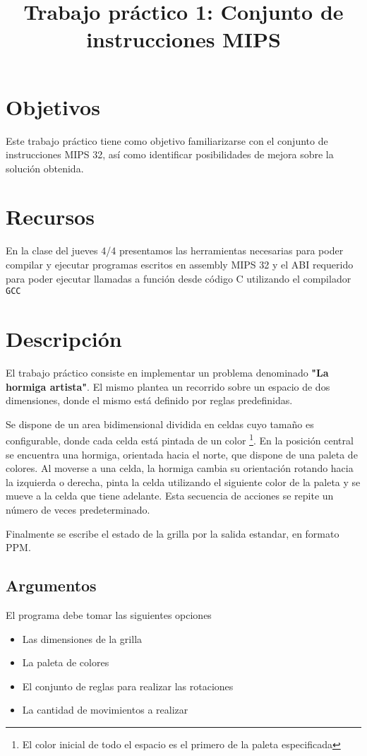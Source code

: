 \documentclass{article}
\title{Trabajo práctico 1: Conjunto de instrucciones MIPS}
\begin{document}
\date{}
\maketitle
\section{Objetivos}
Este trabajo práctico tiene como objetivo familiarizarse con el conjunto de instrucciones
MIPS 32, así como identificar posibilidades de mejora sobre la solución obtenida.

\section{Recursos}
En la clase del jueves 4/4 presentamos las herramientas necesarias para poder compilar y ejecutar
programas escritos en assembly MIPS 32 y el ABI requerido para poder ejecutar llamadas a 
función desde código C utilizando el compilador \texttt{GCC}

\section{Descripción}
El trabajo práctico consiste en implementar un problema denominado \textbf{"La hormiga artista"}. El mismo plantea un recorrido
sobre un espacio de dos dimensiones, donde el mismo está definido por reglas predefinidas.

Se dispone de un area bidimensional dividida en celdas cuyo tamaño es configurable, donde cada celda está pintada de un color 
\footnote{El color inicial de todo el espacio es el primero de la paleta especificada}. En la posición central se encuentra una
hormiga, orientada hacia el norte, que dispone de una paleta de colores. Al moverse a una celda, la hormiga cambia su orientación 
rotando hacia la izquierda o derecha, pinta la celda utilizando el siguiente color de la paleta y se mueve a la celda que tiene adelante. 
Esta secuencia de acciones se repite un número de veces predeterminado.

Finalmente se escribe el estado de la grilla por la salida estandar, en formato PPM.


\subsection{Argumentos}

El programa debe tomar las siguientes opciones
\begin{itemize}
\item Las dimensiones de la grilla
\item La paleta de colores
\item El conjunto de reglas para realizar las rotaciones
\item La cantidad de movimientos a realizar
\end{itemize}
\end{document}
